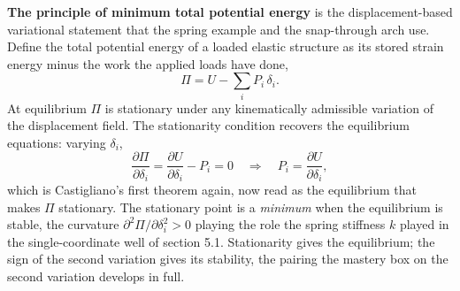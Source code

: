 \textbf{The principle of minimum total potential energy} is the
displacement-based variational statement that the spring example and the
snap-through arch use. Define the total potential energy of a loaded elastic
structure as its stored strain energy minus the work the applied loads have
done,
\[
\Pi = U - \sum_i P_i\,\delta_i.
\]
At equilibrium $\Pi$ is stationary under any kinematically admissible
variation of the displacement field. The stationarity condition recovers the
equilibrium equations: varying $\delta_i$,
\[
\frac{\partial\Pi}{\partial\delta_i}
= \frac{\partial U}{\partial\delta_i} - P_i = 0
\quad\Longrightarrow\quad
P_i = \frac{\partial U}{\partial\delta_i},
\]
which is Castigliano's first theorem again, now read as the equilibrium that
makes $\Pi$ stationary. The stationary point is a \emph{minimum} when the
equilibrium is stable, the curvature $\partial^2\Pi/\partial\delta_i^2 > 0$
playing the role the spring stiffness $k$ played in the single-coordinate
well of section 5.1. Stationarity gives the equilibrium; the sign of the
second variation gives its stability, the pairing the mastery box on the
second variation develops in full.

